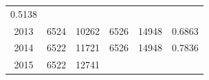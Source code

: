 \documentclass[10pt,]{article}
\begin{document}
\begin{longtable}[]{@{}cccccc@{}}
\begin{minipage}[t]{0.12\columnwidth}
0.5138\strut
\end{minipage}\tabularnewline
\begin{minipage}[t]{0.10\columnwidth}\centering\strut
2013\strut
\end{minipage} & \begin{minipage}[t]{0.13\columnwidth}\centering\strut
6524\strut
\end{minipage} & \begin{minipage}[t]{0.09\columnwidth}\centering\strut
10262\strut
\end{minipage} & \begin{minipage}[t]{0.20\columnwidth}\centering\strut
6526\strut
\end{minipage} & \begin{minipage}[t]{0.16\columnwidth}\centering\strut
14948\strut
\end{minipage} & \begin{minipage}[t]{0.12\columnwidth}\centering\strut
0.6863\strut
\end{minipage}\tabularnewline
\begin{minipage}[t]{0.10\columnwidth}\centering\strut
2014\strut
\end{minipage} & \begin{minipage}[t]{0.13\columnwidth}\centering\strut
6522\strut
\end{minipage} & \begin{minipage}[t]{0.09\columnwidth}\centering\strut
11721\strut
\end{minipage} & \begin{minipage}[t]{0.20\columnwidth}\centering\strut
6526\strut
\end{minipage} & \begin{minipage}[t]{0.16\columnwidth}\centering\strut
14948\strut
\end{minipage} & \begin{minipage}[t]{0.12\columnwidth}\centering\strut
0.7836\strut
\end{minipage}\tabularnewline
\begin{minipage}[t]{0.10\columnwidth}\centering\strut
2015\strut
\end{minipage} & \begin{minipage}[t]{0.13\columnwidth}\centering\strut
6522\strut
\end{minipage} & \begin{minipage}[t]{0.09\columnwidth}\centering\strut
12741\strut
\end{minipage} & \begin{minipage}[t]{0.20\columnwidth}\centering\strut

\end{minipage}
\end{longtable}
\end{document}
